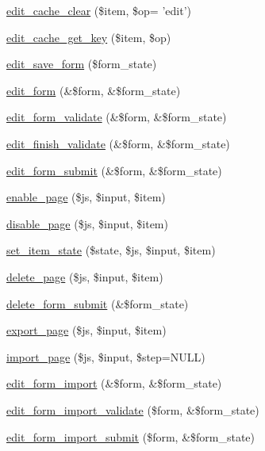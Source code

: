 \begin{DoxyCompactItemize}
\item 
\hyperlink{classctools__export__ui_a9e88dcc95bc69ece09769f9994aec449}{edit\_\-cache\_\-clear} (\$item, \$op= 'edit')
\item 
\hyperlink{classctools__export__ui_a45308950ec010fcbe8ebbb100bba2175}{edit\_\-cache\_\-get\_\-key} (\$item, \$op)
\item 
\hyperlink{classctools__export__ui_a72e3784bc5b24e469fb1ae51d77025b3}{edit\_\-save\_\-form} (\$form\_\-state)
\item 
\hyperlink{classctools__export__ui_a183bc5e2bb1c4c48aedbd1754c5a0058}{edit\_\-form} (\&\$form, \&\$form\_\-state)
\item 
\hyperlink{classctools__export__ui_abce40ac42fe560f1e36709f85d86e121}{edit\_\-form\_\-validate} (\&\$form, \&\$form\_\-state)
\item 
\hyperlink{classctools__export__ui_a1354b4542ef5a4085bcbd3026c7d4527}{edit\_\-finish\_\-validate} (\&\$form, \&\$form\_\-state)
\item 
\hyperlink{classctools__export__ui_ad63b402977462073eade789265987139}{edit\_\-form\_\-submit} (\&\$form, \&\$form\_\-state)
\item 
\hyperlink{classctools__export__ui_a7fdea5d335a536a62e4672b7cd5417db}{enable\_\-page} (\$js, \$input, \$item)
\item 
\hyperlink{classctools__export__ui_a2f660b08aad6dcc3fd84d38c843f815b}{disable\_\-page} (\$js, \$input, \$item)
\item 
\hyperlink{classctools__export__ui_a60998d27b8d164122f1898a97a5666bf}{set\_\-item\_\-state} (\$state, \$js, \$input, \$item)
\item 
\hyperlink{classctools__export__ui_a085f434df28d05870ec395e9d389f29c}{delete\_\-page} (\$js, \$input, \$item)
\item 
\hyperlink{classctools__export__ui_acc9be6d7cff44f93818f021da35b96d5}{delete\_\-form\_\-submit} (\&\$form\_\-state)
\item 
\hyperlink{classctools__export__ui_ab3d10f2741e0736b98f6497ea869cd65}{export\_\-page} (\$js, \$input, \$item)
\item 
\hyperlink{classctools__export__ui_a9b7e82eb64b9f7d5fa57ae2a7e9bcda2}{import\_\-page} (\$js, \$input, \$step=NULL)
\item 
\hyperlink{classctools__export__ui_ab8fc39fc23ac13d24db430913170aa18}{edit\_\-form\_\-import} (\&\$form, \&\$form\_\-state)
\item 
\hyperlink{classctools__export__ui_aa518c562943a8face0d6c65473e96567}{edit\_\-form\_\-import\_\-validate} (\$form, \&\$form\_\-state)
\item 
\hyperlink{classctools__export__ui_a0acf116d80efec9b4d85c9bc0a4118d7}{edit\_\-form\_\-import\_\-submit} (\$form, \&\$form\_\-state)
\end{DoxyCompactItemize}
